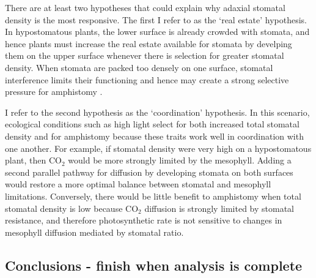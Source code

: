 \documentclass[12pt, oneside]{article}
\begin{document}
There are at least two hypotheses that could explain why adaxial stomatal density is the most responsive. The first I refer to as the `real estate' hypothesis. In hypostomatous plants, the lower surface is already crowded with stomata, and hence plants must increase the real estate available for stomata by develping them on the upper surface whenever there is selection for greater stomatal density. When stomata are packed too densely on one surface, stomatal interference limits their functioning and hence may create a strong selective pressure for amphistomy \citep{Parlange_Waggoner_1970, Dow_etal_2014a}. 

I refer to the second hypothesis as the `coordination' hypothesis. In this scenario, ecological conditions such as high light select for both increased total stomatal density and for amphistomy because these traits work well in coordination with one another. For example, if stomatal density were very high on a hypostomatous plant, then CO$_2$ would be more strongly limited by the mesophyll. Adding a second parallel pathway for diffusion by developing stomata on both surfaces would restore a more optimal balance between stomatal and mesophyll limitations. Conversely, there would be little benefit to amphistomy when total stomatal density is low because CO$_2$ diffusion is strongly limited by stomatal resistance, and therefore photosynthetic rate is not sensitive to changes in mesophyll diffusion mediated by stomatal ratio.



\subsection*{Conclusions - finish when analysis is complete}
\end{document}
